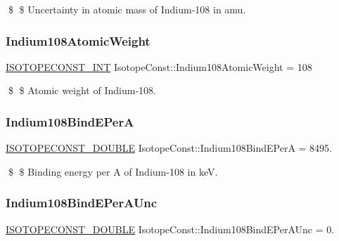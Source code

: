 \$ \$ Uncertainty in atomic mass of Indium-\/108 in amu. \mbox{\label{group___isotope_const-_indium-_in108_gaf2cebcb1879062ea235c30abe8477615}} 
\subsubsection{\texorpdfstring{Indium108\+Atomic\+Weight}{Indium108AtomicWeight}}
{\footnotesize\ttfamily \mbox{\hyperlink{group___isotope_const-_macros_ga5f18360b3e99483a35c32d789e62621c}{I\+S\+O\+T\+O\+P\+E\+C\+O\+N\+S\+T\+\_\+\+I\+NT}} Isotope\+Const\+::\+Indium108\+Atomic\+Weight = 108}

\$ \$ Atomic weight of Indium-\/108. \mbox{\label{group___isotope_const-_indium-_in108_gae1036e671bbc8ab9286cfac1101d7cc3}} 
\subsubsection{\texorpdfstring{Indium108\+Bind\+E\+PerA}{Indium108BindEPerA}}
{\footnotesize\ttfamily \mbox{\hyperlink{group___isotope_const-_macros_ga8f45a7272ce02c0b4c65c44636ed719a}{I\+S\+O\+T\+O\+P\+E\+C\+O\+N\+S\+T\+\_\+\+D\+O\+U\+B\+LE}} Isotope\+Const\+::\+Indium108\+Bind\+E\+PerA = 8495.}

\$ \$ Binding energy per A of Indium-\/108 in keV. \mbox{\label{group___isotope_const-_indium-_in108_ga53983ca55f4d5ee0746473267153cc20}} 
\subsubsection{\texorpdfstring{Indium108\+Bind\+E\+Per\+A\+Unc}{Indium108BindEPerAUnc}}
{\footnotesize\ttfamily \mbox{\hyperlink{group___isotope_const-_macros_ga8f45a7272ce02c0b4c65c44636ed719a}{I\+S\+O\+T\+O\+P\+E\+C\+O\+N\+S\+T\+\_\+\+D\+O\+U\+B\+LE}} Isotope\+Const\+::\+Indium108\+Bind\+E\+Per\+A\+Unc = 0.}

